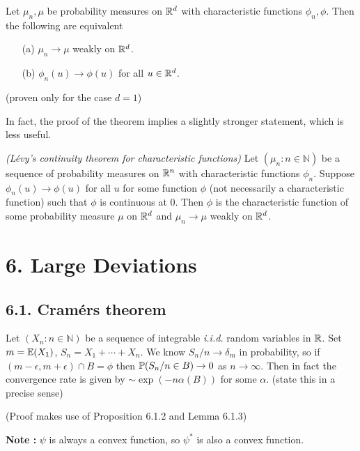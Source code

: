 \documentclass[10pt,a4paper]{report}
\begin{document}
 Let $\mu_n, \mu$ be probability measures on $\mathbb{R}^d$ with characteristic functions $\phi_n, \phi$. Then the following are equivalent
\begin{itemize}
\item[(a)] $\mu_n \rightarrow \mu$ weakly on $\mathbb{R}^d$.
\item[(b)] $\phi_n(u) \rightarrow \phi(u)$ for all $u\in \mathbb{R}^d$.
\end{itemize}
(proven only for the case $d=1$)
\s

In fact, the proof of the theorem implies a slightly stronger statement, which is less useful.
\s

 \emph{(L\'{e}vy's continuity theorem for characteristic functions)} Let $(\mu_n : n\in \mathbb{N})$ be a sequence of probability measures on $\mathbb{R}^n$ with characteristic functions $\phi_n$. Suppose $\phi_n (u) \rightarrow \phi(u)$ for all $u$ for some function $\phi$ (not necessarily a characteristic function) such that $\phi$ is continuous at $0$. Then $\phi$ is the characteristic function of some probability measure $\mu$ on $\mathbb{R}^d$ and $\mu_n \rightarrow \mu$ weakly on $\mathbb{R}^d$.
\s

\section*{6. Large Deviations}
	
\subsection*{6.1. Cram\'{e}rs theorem}

 Let $(X_n : n\in \mathbb{N})$ be a sequence of integrable \emph{i.i.d.} random variables in $\mathbb{R}$. Set $m = \mathbb{E}(X_1)$, $S_n = X_1 + \cdots + X_n$. We know $S_n / n \rightarrow \delta_m$ in probability, so if $(m-\epsilon, m+ \epsilon) \cap B =\phi$ then $\mathbb{P} (S_n/n \in B) \rightarrow 0$ as $n\rightarrow \infty$. Then in fact the convergence rate is given by $\sim \exp (-n \alpha(B))$ for some $\alpha$. (state this in a precise sense)

(Proof makes use of Proposition 6.1.2 and Lemma 6.1.3)
\s

\textbf{Note :} $\psi$ is always a convex function, so $\psi^*$ is also a convex function.
\s
\end{document}
